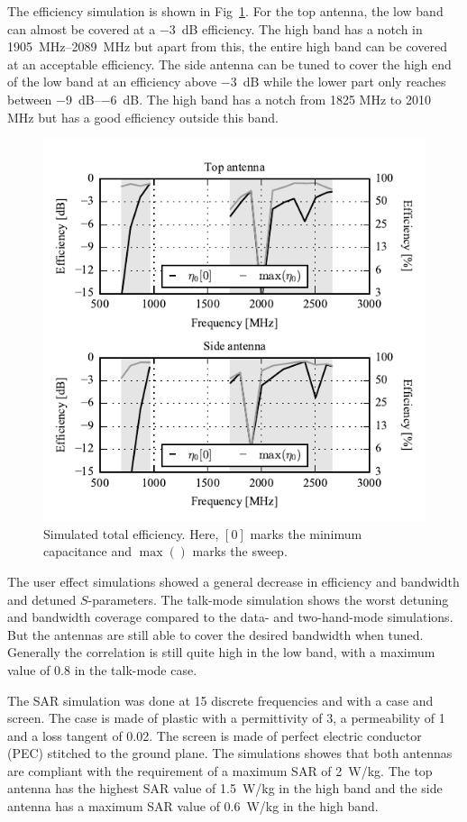 The efficiency simulation is shown in Fig~\ref{fig:sim_eff}. For the top antenna, the low band can almost be covered at a \SI{-3}{dB} efficiency. The high band has a notch in \SIrange{1905}{2089}{MHz} but apart from this, the entire high band can be covered at an acceptable efficiency. The side antenna can be tuned to cover the high end of the low band at an efficiency above
 \SI{-3}{dB} while the lower part only reaches between \SIrange{-9}{-6}{dB}. The high band has a notch from 1825 MHz to 2010 MHz but has a good efficiency outside this band.
\begin{figure}[tb]
    \centering
    \includegraphics{img/sim/eff/efficiency}
    \caption{Simulated total efficiency. Here, $[0]$ marks the minimum capacitance and $\max()$ marks the sweep. }
    \label{fig:sim_eff}
\end{figure}

The user effect simulations showed a general decrease in efficiency and bandwidth and detuned $S$-parameters. The talk-mode simulation shows the worst
detuning and bandwidth coverage compared to the data- and two-hand-mode simulations. But the antennas are still able to cover the desired bandwidth when tuned. Generally the correlation is still quite high in the low band, with a maximum value of 0.8 in the talk-mode case.

The SAR simulation was done at 15 discrete frequencies and with a case and screen. The case is made of plastic with a permittivity of 3, a permeability of 1 and a loss tangent of \num{0.02}. The screen is made of perfect electric conductor (PEC) stitched to the ground plane. The simulations showes that both antennas are compliant with the requirement of a maximum SAR of \SI{2}{W/kg}. The top antenna has the highest SAR value of \SI{1.5}{W/kg} in the high band and the side antenna has a maximum SAR value of \SI{0.6}{W/kg} in the high band. 

